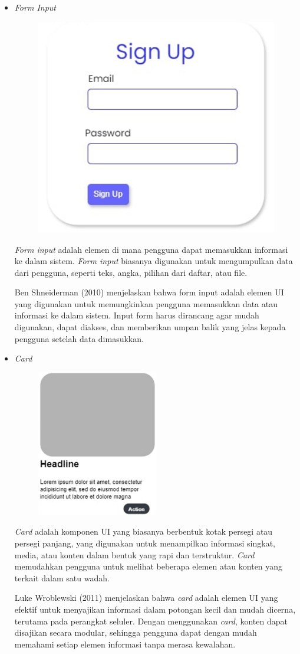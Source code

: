 \documentclass[12pt]{article}
\begin{document}
\begin{itemize}
\item \emph{Form Input} 
\begin{figure}
    \centering
    \includegraphics[width=0.5\linewidth]{asset/formInput.png}
\end{figure}
\par \emph{Form input} adalah elemen di mana pengguna dapat memasukkan informasi ke dalam sistem. \emph{Form input} biasanya digunakan untuk mengumpulkan data dari pengguna, seperti teks, angka, pilihan dari daftar, atau file.
\par Ben Shneiderman (2010) menjelaskan bahwa form input adalah elemen UI yang digunakan untuk memungkinkan pengguna memasukkan data atau informasi ke dalam sistem. Input form harus dirancang agar mudah digunakan, dapat diakses, dan memberikan umpan balik yang jelas kepada pengguna setelah data dimasukkan.

 \item \emph{Card}
\begin{figure}[h] %
    \centering
    \includegraphics[width=0.5\textwidth]{asset/card.png }
\end{figure}
\par \emph{Card} adalah komponen UI yang biasanya berbentuk kotak persegi atau persegi panjang, yang digunakan untuk menampilkan informasi singkat, media, atau konten dalam bentuk yang rapi dan terstruktur. \emph{Card} memudahkan pengguna untuk melihat beberapa elemen atau konten yang terkait dalam satu wadah.
\par Luke Wroblewski (2011) menjelaskan bahwa \emph{card} adalah elemen UI yang efektif untuk menyajikan informasi dalam potongan kecil dan mudah dicerna, terutama pada perangkat seluler. Dengan menggunakan \emph{card}, konten dapat disajikan secara modular, sehingga pengguna dapat dengan mudah memahami setiap elemen informasi tanpa merasa kewalahan.


\end{itemize}
\end{document}

